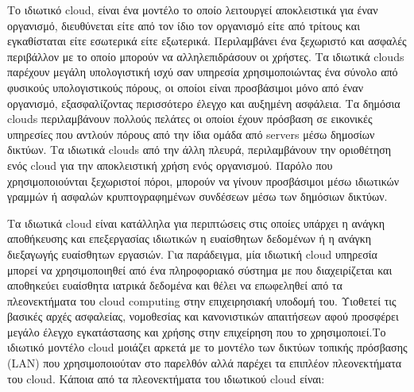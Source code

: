 	 
	Το ιδιωτικό cloud, είναι ένα μοντέλο το οποίο λειτουργεί αποκλειστικά για έναν οργανισμό, διευθύνεται είτε από τον ίδιο τον οργανισμό είτε από τρίτους και εγκαθίσταται είτε εσωτερικά είτε εξωτερικά. Περιλαμβάνει ένα ξεχωριστό και ασφαλές περιβάλλον με το οποίο μπορούν να αλληλεπιδράσουν οι   χρήστες. Τα ιδιωτικά clouds παρέχουν μεγάλη υπολογιστική ισχύ σαν υπηρεσία χρησιμοποιώντας ένα σύνολο από φυσικούς υπολογιστικούς πόρους, οι οποίοι είναι προσβάσιμοι μόνο από έναν οργανισμό, εξασφαλίζοντας περισσότερο έλεγχο και αυξημένη ασφάλεια. Τα δημόσια clouds περιλαμβάνουν πολλούς πελάτες οι οποίοι έχουν πρόσβαση σε εικονικές υπηρεσίες που αντλούν πόρους από την ίδια ομάδα από servers μέσω δημοσίων δικτύων. Τα ιδιωτικά clouds από την άλλη πλευρά, περιλαμβάνουν την οριοθέτηση ενός cloud για την αποκλειστική χρήση ενός οργανισμού. Παρόλο που χρησιμοποιούνται ξεχωριστοί πόροι, μπορούν να γίνουν προσβάσιμοι μέσω ιδιωτικών γραμμών ή ασφαλών κρυπτογραφημένων συνδέσεων μέσω των δημόσιων δικτύων. \cite{Doelitzscher2011} \cite{Missbach}
	
	Τα ιδιωτικά cloud είναι κατάλληλα για περιπτώσεις στις οποίες υπάρχει η ανάγκη αποθήκευσης και επεξεργασίας ιδιωτικών η ευαίσθητων δεδομένων ή η ανάγκη διεξαγωγής ευαίσθητων εργασιών. Για παράδειγμα, μία ιδιωτική cloud υπηρεσία μπορεί να χρησιμοποιηθεί από ένα πληροφοριακό σύστημα με που διαχειρίζεται και αποθηκεύει ευαίσθητα ιατρικά δεδομένα και θέλει να επωφεληθεί από τα πλεονεκτήματα του cloud computing στην επιχειρησιακή υποδομή του. 	Υιοθετεί τις βασικές αρχές ασφαλείας, νομοθεσίας και κανονιστικών απαιτήσεων αφού προσφέρει μεγάλο έλεγχο εγκατάστασης και χρήσης στην επιχείρηση που το χρησιμοποιεί.Το ιδιωτικό μοντέλο cloud μοιάζει  αρκετά με το μοντέλο των  δικτύων τοπικής πρόσβασης (LAN) που χρησιμοποιούταν στο παρελθόν αλλά παρέχει τα επιπλέον πλεονεκτήματα του cloud. Κάποια από τα πλεονεκτήματα του ιδιωτικού cloud είναι:
	
